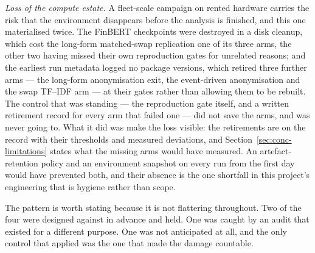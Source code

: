 \emph{Loss of the compute estate.} A fleet-scale campaign on rented hardware
carries the risk that the environment disappears before the analysis is
finished, and this one materialised twice. The FinBERT checkpoints were
destroyed in a disk cleanup, which cost the long-form matched-swap replication
one of its three arms, the other two having missed their own reproduction gates
for unrelated reasons; and the earliest run metadata logged no package versions,
which retired three further arms --- the long-form anonymisation exit, the
event-driven anonymisation and the swap TF--IDF arm --- at their gates rather
than allowing them to be rebuilt. The control that was standing --- the reproduction gate
itself, and a written retirement record for every arm that failed one --- did
not save the arms, and was never going to. What it did was make the loss
visible: the retirements are on the record with their thresholds and measured
deviations, and Section~\ref{sec:conc-limitations} states what the missing arms
would have measured. An artefact-retention policy and an environment snapshot on
every run from the first day would have prevented both, and their absence is the
one shortfall in this project's engineering that is hygiene rather than
scope. %

The pattern is worth stating because it is not flattering throughout. Two of the
four were designed against in advance and held. One was caught by an audit that
existed for a different purpose. One was not anticipated at all, and the only
control that applied was the one that made the damage countable.

